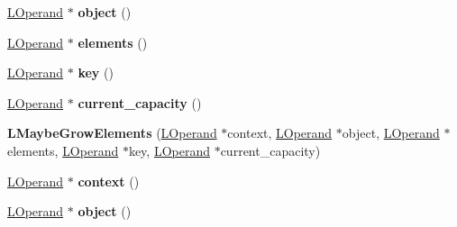 \begin{DoxyCompactItemize}
\item 
\hyperlink{classv8_1_1internal_1_1_l_operand}{L\+Operand} $\ast$ {\bfseries object} ()\hypertarget{classv8_1_1internal_1_1_l_maybe_grow_elements_a557ff494aa6f7b9a2a5f218005419b34}{}\label{classv8_1_1internal_1_1_l_maybe_grow_elements_a557ff494aa6f7b9a2a5f218005419b34}

\item 
\hyperlink{classv8_1_1internal_1_1_l_operand}{L\+Operand} $\ast$ {\bfseries elements} ()\hypertarget{classv8_1_1internal_1_1_l_maybe_grow_elements_aa58e07c5ac443be8021a0a6dbfe237cb}{}\label{classv8_1_1internal_1_1_l_maybe_grow_elements_aa58e07c5ac443be8021a0a6dbfe237cb}

\item 
\hyperlink{classv8_1_1internal_1_1_l_operand}{L\+Operand} $\ast$ {\bfseries key} ()\hypertarget{classv8_1_1internal_1_1_l_maybe_grow_elements_ac0b59ca4db13f2a31428c9b8063321dc}{}\label{classv8_1_1internal_1_1_l_maybe_grow_elements_ac0b59ca4db13f2a31428c9b8063321dc}

\item 
\hyperlink{classv8_1_1internal_1_1_l_operand}{L\+Operand} $\ast$ {\bfseries current\+\_\+capacity} ()\hypertarget{classv8_1_1internal_1_1_l_maybe_grow_elements_a8fc52ebb7ecf6d10f977d9b56cfe702d}{}\label{classv8_1_1internal_1_1_l_maybe_grow_elements_a8fc52ebb7ecf6d10f977d9b56cfe702d}

\item 
{\bfseries L\+Maybe\+Grow\+Elements} (\hyperlink{classv8_1_1internal_1_1_l_operand}{L\+Operand} $\ast$context, \hyperlink{classv8_1_1internal_1_1_l_operand}{L\+Operand} $\ast$object, \hyperlink{classv8_1_1internal_1_1_l_operand}{L\+Operand} $\ast$elements, \hyperlink{classv8_1_1internal_1_1_l_operand}{L\+Operand} $\ast$key, \hyperlink{classv8_1_1internal_1_1_l_operand}{L\+Operand} $\ast$current\+\_\+capacity)\hypertarget{classv8_1_1internal_1_1_l_maybe_grow_elements_aae48ee99b99d58f8e16bc264666c78ff}{}\label{classv8_1_1internal_1_1_l_maybe_grow_elements_aae48ee99b99d58f8e16bc264666c78ff}

\item 
\hyperlink{classv8_1_1internal_1_1_l_operand}{L\+Operand} $\ast$ {\bfseries context} ()\hypertarget{classv8_1_1internal_1_1_l_maybe_grow_elements_a6af5b70c66f542bb308ac9ada8cb6372}{}\label{classv8_1_1internal_1_1_l_maybe_grow_elements_a6af5b70c66f542bb308ac9ada8cb6372}

\item 
\hyperlink{classv8_1_1internal_1_1_l_operand}{L\+Operand} $\ast$ {\bfseries object} ()\hypertarget{classv8_1_1internal_1_1_l_maybe_grow_elements_a557ff494aa6f7b9a2a5f218005419b34}{}\label{classv8_1_1internal_1_1_l_maybe_grow_elements_a557ff494aa6f7b9a2a5f218005419b34}


\end{DoxyCompactItemize}
